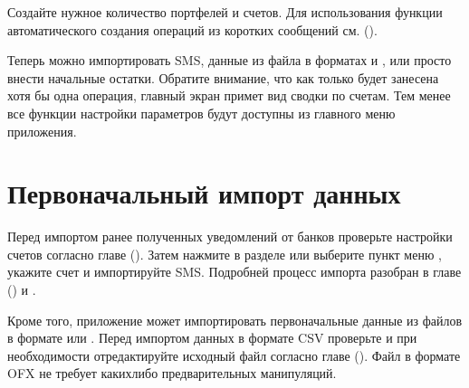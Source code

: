 \documentclass[a4paper,10pt,russian]{sphinxmanual}
\begin{document}
\sphinxAtStartPar
Создайте нужное количество портфелей и счетов. Для использования функции автоматического создания операций из коротких
сообщений см. {\hyperref[\detokenize{account-identities:chapter-account-identities}]{}} ().

\sphinxAtStartPar
Теперь можно импортировать SMS, данные из файла в форматах  и , или просто внести начальные остатки. Обратите внимание, что как только будет занесена хотя
бы одна операция, главный экран примет вид сводки по счетам. Тем менее все функции настройки параметров будут доступны из главного меню приложения.


\section{Первоначальный импорт данных}
\label{\detokenize{getting-started:id5}}
\sphinxAtStartPar
Перед импортом ранее полученных уведомлений от банков проверьте настройки счетов согласно главе {\hyperref[\detokenize{account-identities:chapter-account-identities}]{}} (). Затем нажмите 
в разделе  или выберите пункт меню , укажите счет
и импортируйте SMS. Подробней процесс импорта разобран в главе {\hyperref[\detokenize{import:chapter-import}]{}} () и .

\sphinxAtStartPar
Кроме того, приложение может импортировать первоначальные данные из файлов в формате  или . Перед импортом данных в формате CSV
проверьте и при необходимости отредактируйте исходный файл согласно главе {\hyperref[\detokenize{import:chapter-import}]{}} (). Файл в формате OFX не
требует каких\sphinxhyphen{}либо предварительных манипуляций.
\end{document}
